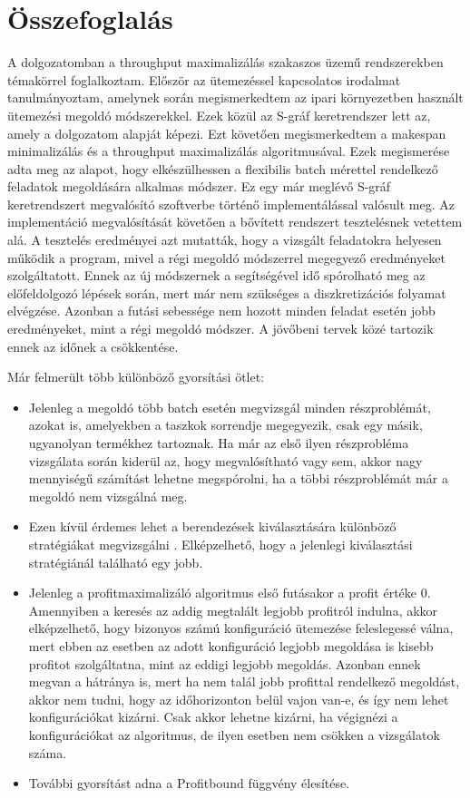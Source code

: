 \chapter{Összefoglalás}
A dolgozatomban a throughput maximalizálás szakaszos üzemű rendszerekben témakörrel foglalkoztam.
Először az ütemezéssel kapcsolatos irodalmat tanulmányoztam, amelynek során megismerkedtem az ipari környezetben használt ütemezési megoldó módszerekkel.
Ezek közül az S-gráf keretrendszer lett az, amely a dolgozatom alapját képezi.
Ezt követően megismerkedtem a makespan minimalizálás és a throughput maximalizálás algoritmusával.
Ezek megismerése adta meg az alapot, hogy elkészülhessen a flexibilis batch mérettel rendelkező feladatok megoldására alkalmas módszer.
Ez egy már meglévő S-gráf keretrendszert megvalósító szoftverbe történő implementálással valósult meg.
Az implementáció megvalósítását követően a bővített rendszert tesztelésnek vetettem alá.
A tesztelés eredményei azt mutatták, hogy a vizsgált feladatokra helyesen működik a program, mivel a régi megoldó módszerrel megegyező eredményeket szolgáltatott.
Ennek az új módszernek a segítségével idő spórolható meg az előfeldolgozó lépések során, mert már nem szükséges a diszkretizációs folyamat elvégzése.
Azonban a futási sebessége nem hozott minden feladat esetén jobb eredményeket, mint a régi megoldó módszer.
A jövőbeni tervek közé tartozik ennek az időnek a csökkentése.

Már felmerült több különböző gyorsítási ötlet:
\begin{itemize}
	\item Jelenleg a megoldó több batch esetén megvizsgál minden részproblémát, azokat is, amelyekben a taszkok sorrendje megegyezik, csak egy másik, ugyanolyan termékhez tartoznak.
	Ha már az első ilyen részprobléma vizsgálata során kiderül az, hogy megvalósítható vagy sem, akkor nagy mennyiségű számítást lehetne megspórolni, ha a többi részproblémát már a megoldó nem vizsgálná meg.
	\item Ezen kívül érdemes lehet a berendezések kiválasztására különböző stratégiákat megvizsgálni \cite{nemes}.
	Elképzelhető, hogy a jelenlegi kiválasztási stratégiánál található egy jobb.
	\item Jelenleg a profitmaximalizáló algoritmus első futásakor a profit értéke 0.
	Amennyiben a keresés az addig megtalált legjobb profitról indulna, akkor elképzelhető, hogy bizonyos számú konfiguráció ütemezése feleslegessé válna, mert ebben az esetben az adott konfiguráció legjobb megoldása is kisebb profitot szolgáltatna, mint az eddigi legjobb megoldás.
	Azonban ennek megvan a hátránya is, mert ha nem talál jobb profittal rendelkező megoldást, akkor nem tudni, hogy az időhorizonton belül vajon van-e, és így nem lehet konfigurációkat kizárni. Csak akkor lehetne kizárni, ha végignézi a konfigurációkat az algoritmus, de ilyen esetben nem csökken a vizsgálatok száma.
	\item További gyorsítást adna a Profitbound függvény élesítése.
\end{itemize}